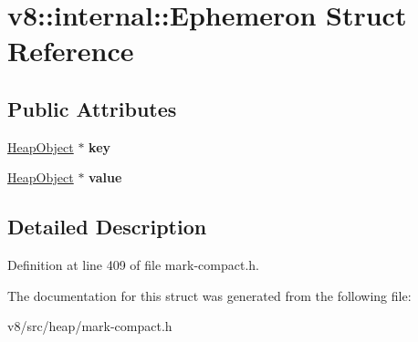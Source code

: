 \hypertarget{structv8_1_1internal_1_1Ephemeron}{}\section{v8\+:\+:internal\+:\+:Ephemeron Struct Reference}
\label{structv8_1_1internal_1_1Ephemeron}
\subsection*{Public Attributes}
\begin{DoxyCompactItemize}
\item 
\mbox{\label{structv8_1_1internal_1_1Ephemeron_a49ee28110e5f42b3eebba399e94f2ca3}} 
\mbox{\hyperlink{classv8_1_1internal_1_1HeapObject}{Heap\+Object}} $\ast$ {\bfseries key}
\item 
\mbox{\label{structv8_1_1internal_1_1Ephemeron_abacfb3d0f2c23e60350df76916b17f4b}} 
\mbox{\hyperlink{classv8_1_1internal_1_1HeapObject}{Heap\+Object}} $\ast$ {\bfseries value}
\end{DoxyCompactItemize}


\subsection{Detailed Description}


Definition at line 409 of file mark-\/compact.\+h.



The documentation for this struct was generated from the following file\+:\begin{DoxyCompactItemize}
\item 
v8/src/heap/mark-\/compact.\+h\end{DoxyCompactItemize}
